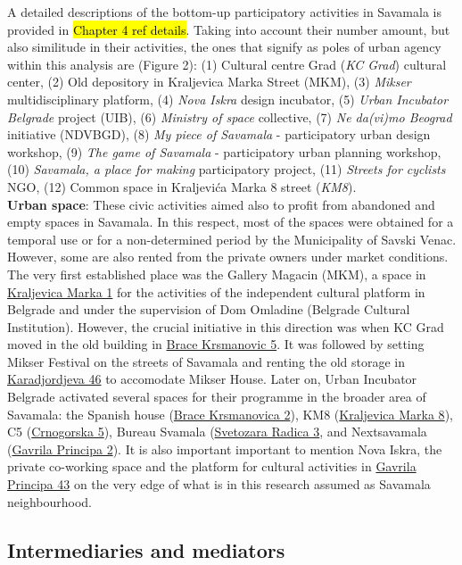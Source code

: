 \documentclass[11pt]{report}
\begin{document}
\begin{itemize}
A detailed descriptions of the bottom-up participatory activities in Savamala is provided in \hl{Chapter 4 ref details}. Taking into account their number amount, but also similitude in their activities, the ones that signify as poles of urban agency within this analysis are (Figure 2):  (1) Cultural centre Grad (\textit{KC Grad}) cultural center, (2) Old depository in Kraljevica Marka Street (MKM), (3) \textit{Mikser} multidisciplinary platform, (4) \textit{Nova Iskra} design incubator, (5) \textit{Urban Incubator Belgrade} project (UIB), (6) \textit{Ministry of space} collective, (7) \textit{Ne da(vi)mo Beograd} initiative (NDVBGD), (8) \textit{My piece of Savamala} - participatory urban design workshop, (9) \textit{The game of Savamala} - participatory urban planning workshop, (10) \textit{Savamala, a place for making} participatory project, (11) \textit{Streets for cyclists} NGO, (12) Common space in Kraljevića Marka 8 street (\textit{KM8}).
\\
\textbf{Urban space}:
These civic activities aimed also to profit from abandoned and empty spaces in Savamala. In this respect, most of the spaces were obtained for a temporal use or for a non-determined period by the Municipality of Savski Venac. However, some are also rented from the private owners under market conditions. The very first established place was the Gallery Magacin (MKM), a space in \underline{Kraljevica Marka 1} for the activities of the independent cultural platform in Belgrade and under the supervision of Dom Omladine (Belgrade Cultural Institution). However, the crucial initiative in this direction was when KC Grad moved in the old building in \underline{Brace Krsmanovic 5}. It was followed by setting Mikser Festival on the streets of Savamala and renting the old storage in \underline{Karadjordjeva 46} to accomodate Mikser House. Later on, Urban Incubator Belgrade activated several spaces for their programme in the broader area of Savamala: the Spanish house (\underline{Brace Krsmanovica 2}),
KM8 (\underline{Kraljevica Marka 8}),
C5 (\underline{Crnogorska 5}),
Bureau Svamala (\underline{Svetozara Radica 3},
and Nextsavamala (\underline{Gavrila Principa 2}). 
It is also important important to mention Nova Iskra, the private co-working space and the platform for cultural activities in \underline{Gavrila Principa 43} on the very edge of what is in this research assumed as Savamala neighbourhood.
\end{itemize}
 
\subsection{Intermediaries and mediators}
\end{document}
